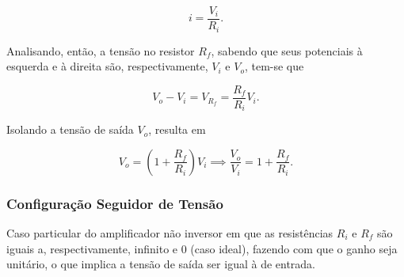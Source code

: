 \documentclass{article}
\numberwithin{equation}{section}
\newcommand{\curtovirtual}{($(opamp.+)+(0.3,0)$) to[open,v^=$ $, l=0, voltage shift=1] ($(opamp.-)+(0.3,0)$)}
\begin{document}
\begin{center}
\end{center}

\begin{equation*}
    i = \dfrac{V_i}{R_i}.
\end{equation*}

\noindent Analisando, então, a tensão no resistor $R_f$, sabendo que seus potenciais à esquerda e à direita são, respectivamente, $V_i$ e $V_o$, tem-se que

\begin{equation*}
    V_o - V_i = V_{R_f} = \dfrac{R_f}{R_i} V_i.
\end{equation*}

\noindent Isolando a tensão de saída $V_o$, resulta em

\begin{equation*}
    V_o = \left(1+\dfrac{R_f}{R_i}\right) V_i \implies \dfrac{V_o}{V_i} = 1+\dfrac{R_f}{R_i}.
\end{equation*}

\subsubsection{Configuração Seguidor de Tensão}
Caso particular do amplificador não inversor em que as resistências $R_{i}$ e $R_{f}$ são iguais a, respectivamente, infinito e $0$ (caso ideal), fazendo com que o ganho seja unitário, o que implica a tensão de saída ser igual à de entrada.

\begin{center}
\end{center}
\end{document}

